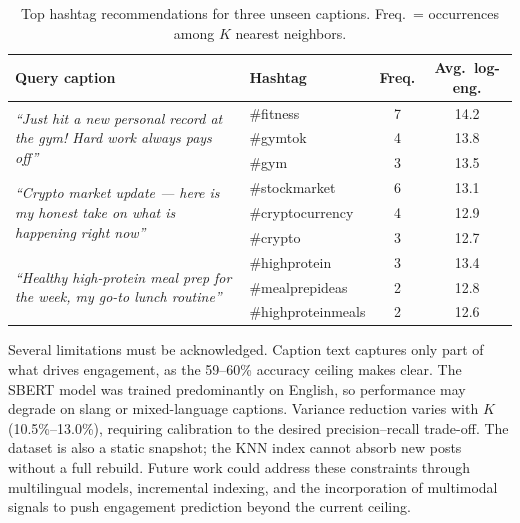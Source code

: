 \documentclass[12pt]{article}
\begin{document}
\begin{table}[H]
    \centering
    \caption{Top hashtag recommendations for three unseen captions.
    Freq.\ = occurrences among $K$ nearest neighbors.}
    \label{tab:recs}
    \setlength{\tabcolsep}{8pt}
    \begin{tabular}{p{5.8cm} p{3.8cm} c c}
        \toprule
        \textbf{Query caption} & \textbf{Hashtag} & \textbf{Freq.} & \textbf{Avg.\ log-eng.} \\
        \midrule
        \multirow{3}{5.8cm}{\textit{``Just hit a new personal record at the gym! Hard work always pays off''}}
            & \#fitness    & 7 & 14.2 \\
            & \#gymtok     & 4 & 13.8 \\
            & \#gym        & 3 & 13.5 \\
        \midrule
        \multirow{3}{5.8cm}{\textit{``Crypto market update --- here is my honest take on what is happening right now''}}
            & \#stockmarket    & 6 & 13.1 \\
            & \#cryptocurrency & 4 & 12.9 \\
            & \#crypto         & 3 & 12.7 \\
        \midrule
        \multirow{3}{5.8cm}{\textit{``Healthy high-protein meal prep for the week, my go-to lunch routine''}}
            & \#highprotein      & 3 & 13.4 \\
            & \#mealprepideas    & 2 & 12.8 \\
            & \#highproteinmeals & 2 & 12.6 \\
        \bottomrule
    \end{tabular}
\end{table}

Several limitations must be acknowledged. Caption text captures only part
of what drives engagement, as the 59--60\% accuracy ceiling makes clear.
The SBERT model was trained predominantly on English, so performance may
degrade on slang or mixed-language captions. Variance reduction varies with
$K$ (10.5\%--13.0\%), requiring calibration to the desired precision--recall
trade-off. The dataset is also a static snapshot; the KNN index cannot
absorb new posts without a full rebuild. Future work could address these
constraints through multilingual models, incremental indexing, and the
incorporation of multimodal signals to push engagement prediction beyond
the current ceiling.
\end{document}
